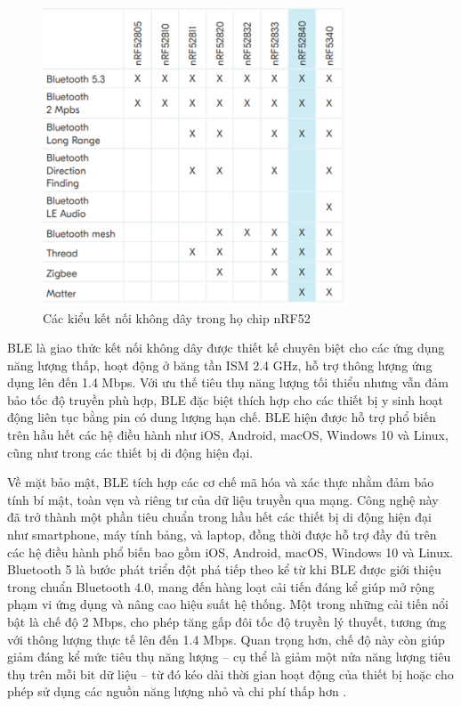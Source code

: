 \begin{figure}[htbp]
		\centering
 		\includegraphics[width=0.8\textwidth]{images/ble.png}
		\caption{Các kiểu kết nối không dây trong họ chip nRF52}
		\label{ble}
\end{figure}

BLE là giao thức kết nối không dây được thiết kế chuyên biệt cho 
các ứng dụng năng lượng thấp, hoạt động ở băng tần ISM 2.4 GHz, 
hỗ trợ thông lượng ứng dụng lên đến 1.4 Mbps. Với ưu thế tiêu thụ năng 
lượng tối thiểu nhưng vẫn đảm bảo tốc độ truyền phù hợp, BLE đặc biệt 
thích hợp cho các thiết bị y sinh hoạt động liên tục bằng pin có dung 
lượng hạn chế. BLE hiện được hỗ trợ phổ biến trên hầu hết các hệ điều 
hành như iOS, Android, macOS, Windows 10 và Linux, cũng như trong các 
thiết bị di động hiện đại.

Về mặt bảo mật, BLE tích hợp các cơ chế mã hóa và xác thực nhằm đảm bảo 
tính bí mật, toàn vẹn và riêng tư của dữ liệu truyền qua mạng. 
Công nghệ này đã trở thành một phần tiêu chuẩn trong hầu hết các 
thiết bị di động hiện đại như smartphone, máy tính bảng, và laptop, 
đồng thời được hỗ trợ đầy đủ trên các hệ điều hành phổ biến bao gồm iOS, 
Android, macOS, Windows 10 và Linux. Bluetooth 5 là bước phát triển 
đột phá tiếp theo kể từ khi BLE được giới thiệu trong chuẩn Bluetooth 
4.0, mang đến hàng loạt cải tiến đáng kể giúp mở rộng phạm vi ứng dụng 
và nâng cao hiệu suất hệ thống. Một trong những cải tiến nổi bật là 
chế độ 2 Mbps, cho phép tăng gấp đôi tốc độ truyền lý thuyết, tương 
ứng với thông lượng thực tế lên đến 1.4 Mbps. Quan trọng hơn, chế độ 
này còn giúp giảm đáng kể mức tiêu thụ năng lượng – cụ thể là giảm một 
nửa năng lượng tiêu thụ trên mỗi bit dữ liệu – từ đó kéo dài thời gian 
hoạt động của thiết bị hoặc cho phép sử dụng các nguồn năng lượng nhỏ 
và chi phí thấp hơn \cite{BLE}. 


